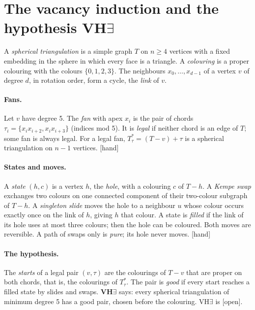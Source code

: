 \documentclass[11pt]{article}
\newcommand{\lab}[1]{\textsf{[#1]}}
\begin{document}
\section{The vacancy induction and the hypothesis VH$\exists$}\label{sec:vh}
A \emph{spherical triangulation} is a simple graph $T$ on $n\ge4$ vertices with a fixed embedding in the sphere in which every face is a triangle. A \emph{colouring} is a proper colouring with the colours $\{0,1,2,3\}$. The neighbours $x_0,\dots,x_{d-1}$ of a vertex $v$ of degree $d$, in rotation order, form a cycle, the \emph{link} of $v$.

\paragraph{Fans.} Let $v$ have degree 5. The \emph{fan} with apex $x_i$ is the pair of chords $\tau_i=\{x_ix_{i+2},x_ix_{i+3}\}$ (indices mod 5). It is \emph{legal} if neither chord is an edge of $T$; some fan is always legal. For a legal fan, $T^\ast_\tau=(T-v)+\tau$ is a spherical triangulation on $n-1$ vertices. \lab{hand}

\paragraph{States and moves.} A \emph{state} $(h,c)$ is a vertex $h$, the \emph{hole}, with a colouring $c$ of $T-h$. A \emph{Kempe swap} exchanges two colours on one connected component of their two-colour subgraph of $T-h$. A \emph{singleton slide} moves the hole to a neighbour $u$ whose colour occurs exactly once on the link of $h$, giving $h$ that colour. A state is \emph{filled} if the link of its hole uses at most three colours; then the hole can be coloured. Both moves are reversible. A path of swaps only is \emph{pure}; its hole never moves. \lab{hand}

\paragraph{The hypothesis.} The \emph{starts} of a legal pair $(v,\tau)$ are the colourings of $T-v$ that are proper on both chords, that is, the colourings of $T^\ast_\tau$. The pair is \emph{good} if every start reaches a filled state by slides and swaps. \textbf{VH$\exists$} says: every spherical triangulation of minimum degree 5 has a good pair, chosen before the colouring. VH$\exists$ is \lab{open}.
\end{document}
